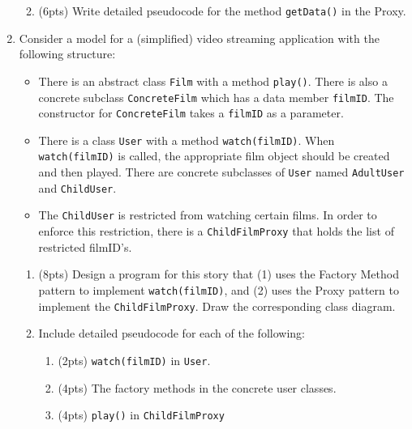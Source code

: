 \documentclass[11pt]{article}
\begin{document}
\begin{enumerate}
\begin{enumerate}
    \vfill
    \vfill

    \item (6pts) Write detailed pseudocode for the method \texttt{getData()} in the Proxy.

    \vfill
    \vfill
    \vfill

  \end{enumerate}

\newpage

  \item Consider a model for a (simplified) video streaming application with the following structure:

  \begin{itemize}

    \item There is an abstract class \texttt{Film} with a method \texttt{play()}. There is also a concrete subclass \texttt{ConcreteFilm} which has a data member \texttt{filmID}. The constructor for \texttt{ConcreteFilm} takes a \texttt{filmID} as a parameter.

    \item There is a class \texttt{User} with a method \texttt{watch(filmID)}. When \texttt{watch(filmID)} is called, the appropriate film object should be created and then played. There are concrete subclasses of \texttt{User} named \texttt{AdultUser} and \texttt{ChildUser}. 

    \item The \texttt{ChildUser} is restricted from watching certain films. In order to enforce this restriction, there is a \texttt{ChildFilmProxy} that holds the list of restricted filmID's.

  \end{itemize}

  \begin{enumerate}

    \item (8pts) Design a program for this story that (1) uses the Factory Method pattern to implement \texttt{watch(filmID)}, and (2) uses the Proxy pattern to implement the \texttt{ChildFilmProxy}. Draw the corresponding class diagram.

    \item Include detailed pseudocode for each of the following:
    \begin{enumerate}
      \item (2pts) \texttt{watch(filmID)} in \texttt{User}.
      \item (4pts) The factory methods in the concrete user classes.
      \item (4pts) \texttt{play()} in \texttt{ChildFilmProxy} 
    \end{enumerate}


\end{enumerate}
\end{enumerate}
\end{document}
